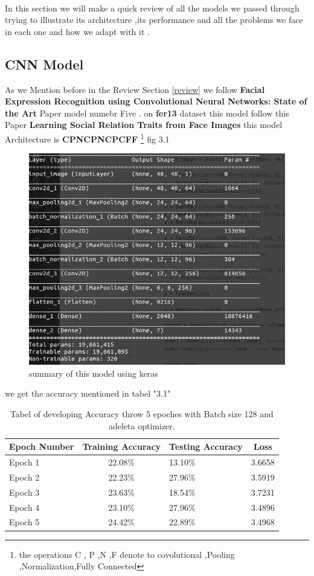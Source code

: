 \paragraph{}
In this section we will make a quick review of all the models we passed through trying to illustrate its architecture ,its performance and all the problems we face in each one and how we adapt with it .
\subsection{CNN Model}
As we Mention before in the Review Section \ref{review} we follow \textbf{Facial Expression Recognition using Convolutional Neural Networks: State of the Art} Paper\cite{state_of_art} model numebr Five .
on \textbf{fer13} dataset this model follow this Paper \textbf{Learning Social Relation Traits from Face Images} this model Architecture is \textbf{CPNCPNCPCFF} \footnote{ the operations C , P ,N ,F denote to covolutional ,Pooling ,Normalization,Fully Connected } fig 3.1

\begin{figure}
	\centering
	\includegraphics[width=.8\textwidth]{model14.jpg}
	\caption{summary of this model using keras}
\end{figure} 
we get the accuracy mentioned in tabel "3.1"
\begin{table}[h!]
	\begin{center}
		\caption{Tabel of developing Accuracy throw  5 epoches with Batch size 128 and adeleta optimizer.}
		\begin{tabular}{l|c|l|c}
			\textbf{Epoch Number} & \textbf{Training Accuracy} & \textbf{Testing Accuracy} &\textbf{Loss}\\ 
			\hline 
			Epoch 1 & 22.08\% & 13.10\% & 3.6658 \\
			Epoch 2 & 22.23\% & 27.96\% & 3.5919 \\
			Epoch 3 & 23.63\% & 18.54\% & 3.7231 \\
			Epoch 4 & 23.10\% & 27.96\% & 3.4896 \\
			Epoch 5 & 24.42\% & 22.89\% &  3.4968 \\									
			\end{tabular}
	\end{center}
\end{table}

